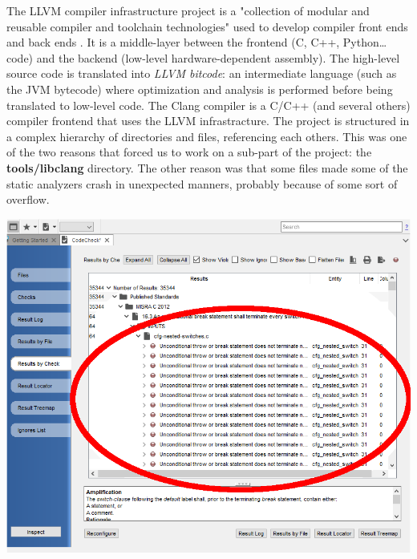 The LLVM compiler infrastructure project is a "collection of modular and reusable compiler and toolchain technologies" used to develop compiler front ends and back ends \cite{bibitem1}. It is a middle-layer between the frontend (C, C++, Python\dots code) and the backend (low-level hardware-dependent assembly). The high-level source code is translated into \textsl{LLVM bitcode}: an intermediate language (such as the JVM bytecode) where optimization and analysis is performed before being translated to low-level code.\newline
The Clang compiler is a C/C++ (and several others) compiler frontend that uses the LLVM infrastracture. 
The project is structured in a complex hierarchy of directories and files, referencing each others. This was one of the two reasons that forced us to work on a sub-part of the project: the \textbf{tools/libclang} directory. The other reason was that some files made some of the static analyzers crash in unexpected manners, probably because of some sort of overflow.\newline\newline
\begin{minipage}{\linewidth}
	\includegraphics[width=\textwidth]{img/overflowUnderstand.png}
\end{minipage}

